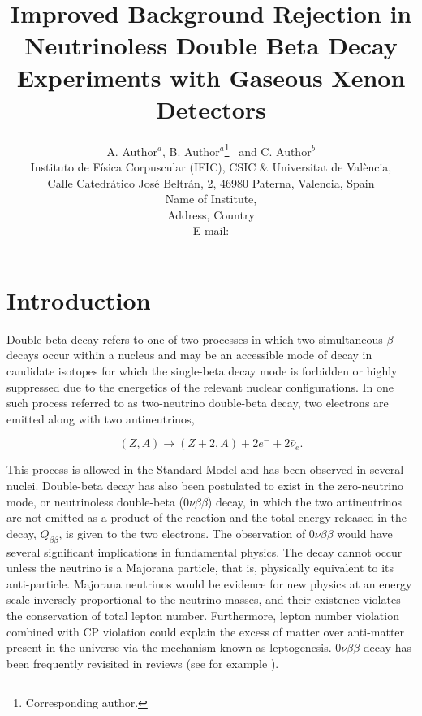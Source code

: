 \documentclass{JINST}
\title{Improved Background Rejection in Neutrinoless Double Beta Decay Experiments with Gaseous Xenon Detectors}
\author{A. Author$^a$,
B. Author$^a$\thanks{Corresponding author.}~
and C. Author$^b$\\
\llap{$^a$}Instituto de F\'isica Corpuscular (IFIC), CSIC \& Universitat de Val\`encia,\\ 
Calle Catedr\'atico Jos\'e Beltr\'an, 2, 46980 Paterna, Valencia, Spain\\
\llap{$^b$}Name of Institute,\\
  Address, Country\\
E-mail: \email{CorrespondingAuthor@email.com}}
\begin{document}
\section{Introduction}\label{sec:intro}
Double beta decay refers to one of two processes in which two simultaneous $\beta$-decays occur within a nucleus and
may be an accessible mode of decay in candidate isotopes for which the single-beta decay mode is forbidden or highly
suppressed due to the energetics of the relevant nuclear configurations.  In one such process referred to as two-neutrino
double-beta decay, two electrons are emitted along with two antineutrinos,

\begin{equation}
 (Z,A) \rightarrow (Z+2,A) + 2e^{-} + 2\bar{\nu}_{e}.
\end{equation}

This process is allowed in the Standard Model and has been observed in several nuclei.  Double-beta decay has also been
postulated to exist in the zero-neutrino mode, or neutrinoless double-beta ($0\nu\beta\beta$) decay, in which the two 
antineutrinos are not emitted as a product of the reaction and the total energy released in the decay, $Q_{\beta\beta}$, is 
given to the two electrons.  The observation of $0\nu\beta\beta$ would have several significant implications
in fundamental physics.  The decay cannot occur unless the neutrino is a Majorana particle, that is,
physically equivalent to its anti-particle.  Majorana neutrinos would be evidence for new physics at an energy 
scale inversely proportional to the neutrino masses, and their existence violates the conservation of total lepton 
number.  Furthermore, lepton number violation combined with CP violation could explain the excess of matter 
over anti-matter present in the universe via the mechanism known as leptogenesis.  $0\nu\beta\beta$ decay 
has been frequently revisited in reviews (see for example \cite{Cadenas_2012, Bilenky_2010, Elliot_2012}).
\end{document}
